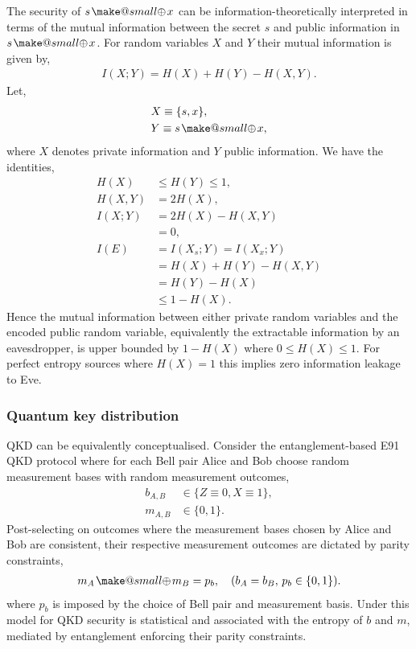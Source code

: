 \documentclass[twocolumn, aps, amsmath, amssymb, nofootinbib, superscriptaddress, longbibliography, doublefloatfix, table-of-contents, eqsecnum, rmp]{revtex4-2}
\makeatletter
\newcommand{\soplus}{{{\hspace{1pt}}{\mathbin{\mathpalette\make@small\oplus}}}{\hspace{1pt}}}
\newcommand{\make@small}[2]{%
  \vcenter{\hbox{%
    \scalebox{0.6}{$\m@th#1#2$}%
  }}%
}
\makeatother
\begin{document}
The security of $s\soplus x$ can be information-theoretically interpreted in terms of the mutual information between the secret $s$ and public information in $s\soplus x$. For random variables $X$ and $Y$ their mutual information is given by,
\begin{align}
	I(X;Y) = H(X) + H(Y) - H(X,Y).	
\end{align}
Let,
\begin{align}
 	&X\equiv \{s,x\},\nonumber\\
 	&Y\equiv s\soplus x,
\end{align} 
where $X$ denotes private information and $Y$ public information. We have the identities,
\begin{align}
 	H(X) &\leq H(Y) \leq 1,\nonumber\\
	H(X,Y) &= 2H(X),\nonumber\\
	I(X;Y) &= 2H(X)-H(X,Y)\nonumber\\
	&= 0,\nonumber\\
	I(E) &= I(X_s;Y) = I(X_x;Y)\nonumber\\
	&= H(X)+H(Y)-H(X,Y)\nonumber\\
	&= H(Y) - H(X)\nonumber\\
	&\leq 1-H(X).
\end{align}
Hence the mutual information between either private random variables and the encoded public random variable, equivalently the extractable information by an eavesdropper, is upper bounded by $1-H(X)$ where $0\leq H(X)\leq 1$. For perfect entropy sources where $H(X)=1$ this implies zero information leakage to Eve.

\subsubsection{Quantum key distribution}

QKD can be equivalently conceptualised. Consider the entanglement-based E91 QKD protocol where for each Bell pair Alice and Bob choose random measurement bases with random measurement outcomes,
\begin{align}
	b_{A,B} &\in \{Z\equiv 0, X\equiv 1\},\nonumber\\
	m_{A,B} &\in \{0,1\}.
\end{align}
Post-selecting on outcomes where the measurement bases chosen by Alice and Bob are consistent, their respective measurement outcomes are dictated by parity constraints,
\begin{align}
	m_A\soplus m_B = p_b,\quad (b_A=b_B,\, p_b\in\{0,1\}).
\end{align}
where $p_b$ is imposed by the choice of Bell pair and measurement basis. Under this model for QKD security is statistical and associated with the entropy of $b$ and $m$, mediated by entanglement enforcing their parity constraints.
\end{document}

